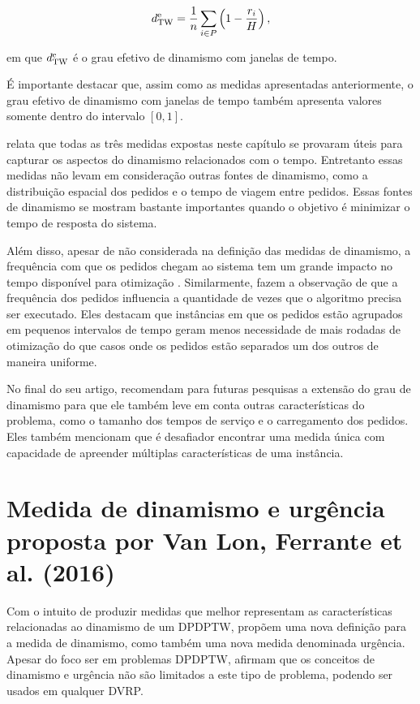 \begin{equation}
  d^\text{e}_\text{TW} = 
  \frac{1}{n}
  \sum_{i \in P}
  {
    \left(
      1 - \frac{r_i}{H}
    \right),
  }
\end{equation}

\noindent em que $d^\text{e}_\text{TW}$ é o grau efetivo de dinamismo com 
janelas de tempo.

É importante destacar que, assim como as medidas apresentadas anteriormente, o
grau efetivo de dinamismo com janelas de tempo também apresenta valores somente
dentro do intervalo $[0, 1]$.

 relata que todas as três medidas expostas neste
capítulo se provaram úteis para capturar os aspectos do dinamismo relacionados
com o tempo.
Entretanto essas medidas não levam em consideração outras fontes de dinamismo,
como a distribuição espacial dos pedidos e o tempo de viagem entre pedidos.
Essas fontes de dinamismo se mostram bastante importantes quando o objetivo é
minimizar o tempo de resposta do sistema.

Além disso, apesar de não considerada na definição das medidas de dinamismo, a
frequência com que os pedidos chegam ao sistema tem um grande impacto no tempo
disponível para otimização \cite{pillac_review_2013}.
Similarmente,  fazem a observação de que a
frequência dos pedidos influencia a quantidade de vezes que o algoritmo
precisa ser executado.
Eles destacam que instâncias em que os pedidos estão agrupados em
pequenos intervalos de tempo geram menos necessidade de mais rodadas de
otimização do que casos onde os pedidos estão separados um dos outros de 
maneira uniforme.

No final do seu artigo,  recomendam
para futuras pesquisas a extensão do grau de dinamismo para que ele também 
leve em conta outras características do problema, como o tamanho dos tempos de 
serviço e o carregamento dos pedidos.
Eles também mencionam que é desafiador encontrar uma medida única com
capacidade de apreender múltiplas características de uma instância.






\section{Medida de dinamismo e urgência proposta por Van Lon, Ferrante et al.
         (2016)}\label{sec:medidas_van_lon}
Com o intuito de produzir medidas que melhor representam as características
relacionadas ao dinamismo de um DPDPTW,  
propõem uma nova definição para a medida de dinamismo, como também uma nova
medida denominada urgência.
Apesar do foco ser em problemas DPDPTW, 
afirmam que os conceitos de dinamismo e urgência não são limitados a este tipo
de problema, podendo ser usados em qualquer DVRP.

